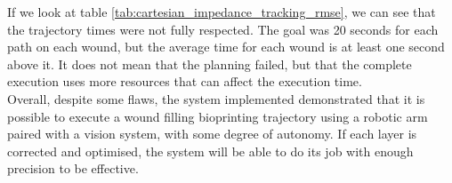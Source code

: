 If we look at table \ref{tab:cartesian_impedance_tracking_rmse}, we can see that the trajectory times were not fully respected. The goal was 20 seconds for each path on each wound, but the average time for each wound is at least one second above it. It does not mean that the planning failed, but that the complete execution uses more resources that can affect the execution time. \\

Overall, despite some flaws, the system implemented demonstrated that it is possible to execute a wound filling bioprinting trajectory using a robotic arm paired with a vision system, with some degree of autonomy. If each layer is corrected and optimised, the system will be able to do its job with enough precision to be effective.

